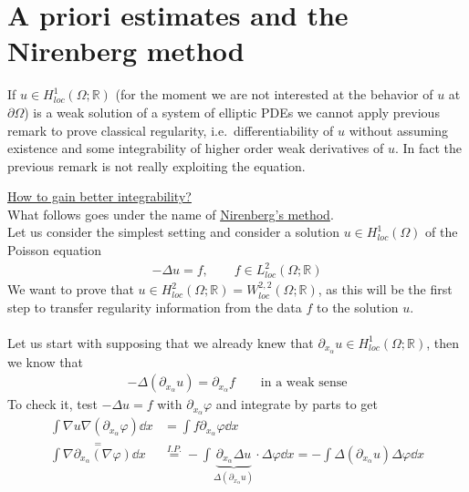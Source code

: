 \section{A priori estimates and the Nirenberg method}

If \( u \in  H_{loc}^{1} (\Omega; \mathbb{R})  \) (for the moment we are not interested at the behavior of \( u \) at \( \partial \Omega \)) is a weak solution of a system of elliptic PDEs we cannot apply previous remark to prove classical regularity, i.e.\ differentiability of \( u \) without assuming existence and some integrability of higher order weak derivatives of \( u \). In fact the previous remark is not really exploiting the equation.\\
\par
\underline{How to gain better integrability?}\\
What   follows goes under the name of \underline{Nirenberg's method}.\\
Let us consider the simplest setting and consider a solution \( u \in H_{loc}^{1} (\Omega)  \) of the Poisson equation
\begin{gather}
	- \Delta u = f, \qquad f \in L_{loc}^{2} (\Omega ;\mathbb{R})
\end{gather}
We want to prove that \( u \in H_{loc}^{2} (\Omega ; \mathbb{R}) =W_{loc}^{2,2} (\Omega ;\mathbb{R})  \), as this will be the first step to transfer regularity information from the data \( f \) to the solution \( u \).\\
\\
Let us start with supposing that we already knew that \( \partial_{x_{\alpha }} u \in H_{loc}^{1} (\Omega ;\mathbb{R})  \), then we know that
\begin{gather}
	-\Delta (\partial_{x_{\alpha }} u) = \partial_{x_{\alpha }} f \qquad \text{in a weak sense}
\end{gather}
To check it, test \( -\Delta u=f \) with \( \partial_{x_{\alpha }} \varphi  \) and integrate by parts to get
\begin{align}
	\int \nabla u \nabla (\partial_{x_{\alpha }}\varphi )  \dd{x}           & = \int f \partial_{x_{\alpha }}\varphi  \dd{x}                                                                                                                                                          \\
	\overset{=}{\int \nabla \partial_{x_{\alpha }}(\nabla \varphi)  \dd{x}} & \overset{I.P.}{=} - \int \underbrace{\partial_{x_{\alpha }} \Delta u}_{\Delta (\partial_{x_{\alpha }} u) } \cdot \Delta \varphi \dd{x} = - \int \Delta (\partial_{x_{\alpha }}u) \Delta \varphi  \dd{x}
\end{align}
